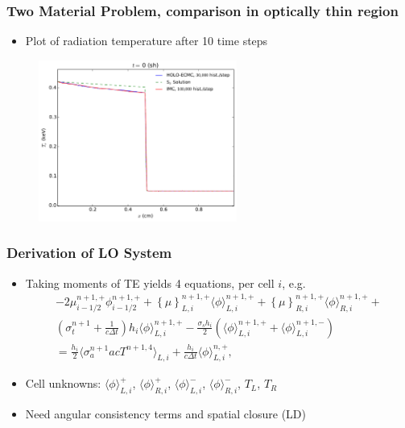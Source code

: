 \documentclass[xcolor=dvipsnames,hyperref={pdfpagelabels=false},unknownkeysallowed]{beamer}
\newcommand{\colb}[1]{{\color{blue} #1}}
\newlength{\wideitemsep}
\let\olditem\item
\renewcommand{\item}{\setlength{\itemsep}{\wideitemsep}\olditem}
\newcommand{\mom}[1]{\langle #1 \rangle}
\newcommand{\cur}[1]{\left\{ #1 \right\}}
\begin{document}
\begin{frame}
    \frametitle{Two Material Problem, comparison in optically thin region}
    \begin{block}{}
        \begin{itemize}
            \item Plot of radiation temperature after 10 time steps
        \end{itemize}
    \end{block}
\begin{figure}
    \centering
    \includegraphics[width=0.5799\textwidth]{quick_compare.pdf}
\end{figure}

\end{frame}




\begin{frame}
    \frametitle{Derivation of LO System}
    \begin{itemize}
        \item Taking moments of TE yields \colb{4 equations}, per cell $i$, e.g.
\begin{multline}\label{lo_tran}
    -2{\mu}_{i-1/2}^{n+1,+} \phi_{i-1/2}^{n+1,+} + \cur {\mu}_{L,i}^{n+1,+}
  \mom{\phi}_{L,i}^{n+1,+}
  +  \cur\mu_{R,i}^{n+1,+}
  \mom{\phi}_{R,i}^{n+1,+} +  \\ \left(\sigma_t^{n+1}+\frac{1}{c \Delta t} \right) h_i 
  \mom{\phi}_{L,i}^{n+1,+} -  \frac{\sigma_s h_i}{2} \left( \mom{\phi}_{L,i}^{n+1,+} +
  \mom\phi_{L,i}^{n+1,-}\right) \\ = \frac{h_i}{2} \mom{\sigma_a^{n+1} a c T^{n+1,4}}_{L,i} +
  \frac{h_i}{c\Delta t}\mom{\phi}_{L,i}^{n,+},
\end{multline}
        \item Cell unknowns: $\mom{\phi}_{L,i}^{+}$, $\mom{\phi}_{R,i}^{+}$,
        $\mom{\phi}_{L,i}^{-}$, $\mom{\phi}_{R,i}^{-}$, $T_L$, $T_R$

    \item Need \colb{angular} consistency terms  and spatial closure
        (LD)
    \end{itemize}

\end{frame}


\setcounter{framenumber}{\value{finalframe}}
\end{document}
